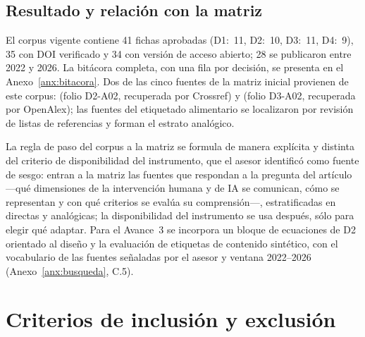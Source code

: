 \documentclass[letter,12pt]{article}
\begin{document}
\subsection{Resultado y relación con la matriz}

El corpus vigente contiene 41 fichas aprobadas (D1:~11, D2:~10, D3:~11, D4:~9), 35 con DOI verificado y 34 con versión de acceso abierto; 28 se publicaron entre 2022 y 2026. La bitácora completa, con una fila por decisión, se presenta en el Anexo~\ref{anx:bitacora}. Dos de las cinco fuentes de la matriz inicial provienen de este corpus: \citet{seeger2026} (folio D2-A02, recuperada por Crossref) y \citet{axelsson2021} (folio D3-A02, recuperada por OpenAlex); las fuentes del etiquetado alimentario se localizaron por revisión de listas de referencias y forman el estrato analógico.

La regla de paso del corpus a la matriz se formula de manera explícita y distinta del criterio de disponibilidad del instrumento, que el asesor identificó como fuente de sesgo: entran a la matriz las fuentes que respondan a la pregunta del artículo ---qué dimensiones de la intervención humana y de IA se comunican, cómo se representan y con qué criterios se evalúa su comprensión---, estratificadas en directas y analógicas; la disponibilidad del instrumento se usa después, sólo para elegir qué adaptar. Para el Avance~3 se incorpora un bloque de ecuaciones de D2 orientado al diseño y la evaluación de etiquetas de contenido sintético, con el vocabulario de las fuentes señaladas por el asesor y ventana 2022--2026 (Anexo~\ref{anx:busqueda}, C.5).


\section{Criterios de inclusión y exclusión}\label{sec:criterios}
\end{document}
